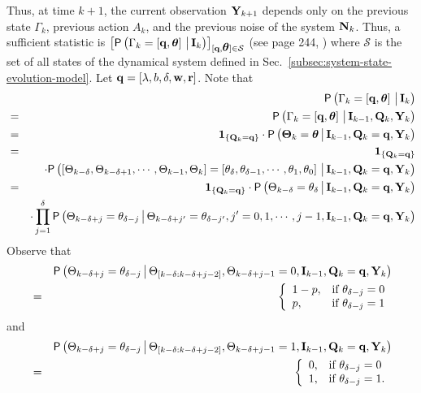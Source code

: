\documentclass[acmtosn]{acmtrans2m}
\newcommand{\prob}[1]{\mathsf{P}\left(#1\right)}
\newcommand{\nn}{\nonumber \\}
{\theorembodyfont{\rmfamily}
\newtheorem{remarks}{Remark}[section]} \newtheorem{theorem}{Theorem}
\begin{document}
Thus, at time $k+1$, the current observation ${\bf Y}_{k+1}$ depends only on the 
previous state $\Gamma_k$, previous action $A_k$, and the previous noise 
of the system ${\bf N}_k$. Thus, a sufficient statistic is  
$\left[\prob{\Gamma_k=\left[{\bf q}, {\mbox{\boldmath$\theta$}}\right] 
\big\arrowvert {\bf I}_k}\right]_{[{\bf q}, {\mbox{\boldmath$\theta$}} ]\in\mathcal{S}}$ 
(see page 244, \cite{books.bertsekas00a}) where $\mathcal{S}$ is the 
set of all states of the dynamical system defined in 
Sec.~\ref{subsec:system-state-evolution-model}. 
Let ${\bf q} = [\lambda,b,\delta,{\bf w},{\bf r}]$.
Note that 
{
\begin{eqnarray}
\label{eqn:sufficient-stat}
& &\prob{\Gamma_k = \left[{\bf q},
{\mbox{\boldmath$\theta$}}\right] \big\arrowvert{\bf I}_k}\nn   
& = &\prob{\Gamma_k = \left[{\bf q},
{\mbox{\boldmath$\theta$}}\right] \big\arrowvert{\bf I}_{k-1}, {\bf
Q}_k, {\bf Y}_k}\nn   
& = & {\bf 1}_{\{{\bf Q}_k = {\bf q} \}} \cdot 
\prob{{\bf \Theta}_k = {\mbox{\boldmath$\theta$}}\big\arrowvert {\bf
I}_{k-1}, {\bf Q}_k = {\bf q}, {\bf Y}_k } \nn 
& = & {\bf 1}_{\{{\bf Q}_k = {\bf q} \}}\nn
& & \cdot 
 \prob{\left[\Theta_{k-\delta},
\Theta_{k-\delta+1},\cdots,\Theta_{k-1},\Theta_k\right] = 
\left[\theta_{\delta}, \theta_{\delta-1}, \cdots, \theta_1,
\theta_0\right] \big\arrowvert {\bf
I}_{k-1}, {\bf Q}_k = {\bf q},{\bf Y}_k } \nn 
& = & {\bf 1}_{\{{\bf Q}_k = {\bf q} \}} \cdot 
\prob{\Theta_{k-\delta} = \theta_{\delta}
\big\arrowvert {\bf I}_{k-1}, {\bf Q}_k = {\bf q}, {\bf Y}_k
} \nn 
& & \cdot \prod_{j=1}^\delta \prob{\Theta_{k-\delta+j} = \theta_{\delta-j}
\big\arrowvert \Theta_{k-\delta+j'}=\theta_{\delta-j'},
j'=0,1,\cdots,j-1, {\bf I}_{k-1}, {\bf Q}_k = {\bf q}, {\bf Y}_k }\nn 
\end{eqnarray}
}
Observe that
\begin{eqnarray*}
 & & \prob{\Theta_{k-\delta+j} = \theta_{\delta-j} 
\big\arrowvert \Theta_{[k-\delta:k-\delta+j-2]},  \Theta_{k-\delta+j-1}=
0, {\bf I}_{k-1}, {\bf Q}_k = {\bf q},
{\bf Y}_k }\nn 
& = & \left\{
\begin{array}{ll}
1-p, & \text{if} \ \theta_{\delta-j} = 0\\
p,   & \text{if} \ \theta_{\delta-j} = 1
\end{array}
\right.
\end{eqnarray*}
and
\begin{eqnarray*}
&&  \prob{\Theta_{k-\delta+j} = \theta_{\delta-j} 
\big\arrowvert \Theta_{[k-\delta:k-\delta+j-2]},
\Theta_{k-\delta+j-1}=1,  {\bf I}_{k-1}, {\bf Q}_k =
{\bf q},
{\bf Y}_k }\nn 
& = & \left\{
\begin{array}{ll}
0, & \text{if} \ \theta_{\delta-j} = 0\\
1,   & \text{if} \ \theta_{\delta-j} = 1.
\end{array}
\right.
\end{eqnarray*}
\end{document}
